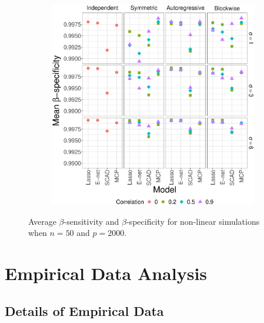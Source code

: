 \documentclass{article}
\begin{document}
\begin{figure}[!htb]
\begin{subfigure}[b]{0.47\textwidth}
			\includegraphics[width=\textwidth]{images/facet/publication_facet_specificity_nonlinear_50_2000.eps}
			\label{fig:nonlinear-specificity}
		\end{subfigure}
		\captionsetup{width=0.8\textwidth}
		\caption{Average $\beta$-sensitivity and $\beta$-specificity for non-linear simulations when $n = 50$ and $p = 2000$.}
		\label{fig:nonlinear-beta}
	\end{figure}
	
	\section{Empirical Data Analysis}\label{sec:empirical}
	\subsection{Details of Empirical Data}
	
\end{document}
